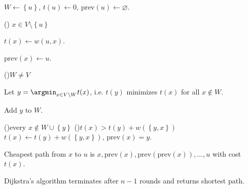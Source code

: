\begin{algorithm}[H]
    \caption{Dijkstra's algorithm}
    \(W \gets \left\{ u \right\} \), \(t(u) \gets 0\), \(\text{prev}(u) \gets \varnothing\). 

    \For() {\(x \in V \setminus \left\{ u \right\} \) } {
        \(t(x) \gets w(u,x)\). 
        
        \(\mathrm{prev}(x) \gets u \). 
    } 

    \While(){\(W \neq V\)}{
        Let \(y = \argmin_{x \in V\setminus W} t(x) \), i.e. \(t(y)\) minimizes \(t(x)\) for all \(x \notin W\). 

        Add \(y\) to \(W\). 

        \For(){every \(x \notin W \cup \left\{ y \right\} \)} {
            \If(){\(t(x) > t(y) + w(\left\{ y,x \right\} )\)}{
                \(t(x) \gets t(y) + w(\left\{ y, x \right\} )\), \(\text{prev}(x) = y\).  
            }
        }      
    }   

    Cheapest path from \(x\) to \(u\) is \(x, \text{prev}(x), \text{prev}(\text{prev}(x)), \dots , u\) with cost \(t(x)\).       
\end{algorithm}

\begin{theorem}
    Dijkstra's algorithm terminates after \(n - 1\) rounds and returns shortest path. 
\end{theorem}

